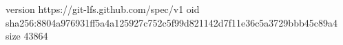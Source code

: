 version https://git-lfs.github.com/spec/v1
oid sha256:8804a976931ff5a4a125927c752c5f99d821142d7f11e36c5a3729bbb45c89a4
size 43864
